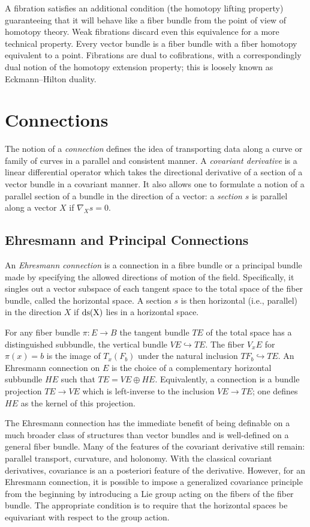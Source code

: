 \documentclass{article}
\theoremstyle{definition}
\begin{document}
    
    A fibration satisfies an additional condition (the homotopy lifting property) guaranteeing that it will behave like a fiber bundle from the point of view of homotopy theory. Weak fibrations discard even this equivalence for a more technical property. Every vector bundle is a fiber bundle with a fiber homotopy equivalent to a point.  Fibrations are dual to cofibrations, with a correspondingly dual notion of the homotopy extension property; this is loosely known as Eckmann–Hilton duality.
    

\section{Connections}
    The notion of a \textit{connection} defines the idea of transporting data along a curve or family of curves in a parallel and consistent manner. A \textit{covariant derivative} is a linear differential operator which takes the directional derivative of a section of a vector bundle in a covariant manner. It also allows one to formulate a notion of a parallel section of a bundle in the direction of a vector: a \textit{section} $s$ is parallel along a vector $X$ if $\nabla _{X}s=0$. 

\subsection{Ehresmann and Principal Connections}
    An \textit{Ehresmann connection} is a connection in a fibre bundle or a principal bundle made by specifying the allowed directions of motion of the field. Specifically, it singles out a vector subspace of each tangent space to the total space of the fiber bundle, called the horizontal space. A section $s$ is then horizontal (i.e., parallel) in the direction $X$ if $\rm {d}s(X)$ lies in a horizontal space.

    For any fiber bundle $\pi : E \rightarrow B$ the tangent bundle $T E$ of the total space has a distinguished subbundle, the vertical bundle $V E \hookrightarrow T E$. The fiber $V_xE$ for $\pi(x) = b$ is the image of $T_x(F_b)$ under the natural inclusion $T F_b \hookrightarrow T E$. An Ehresmann connection on $E$ is the choice of a complementary horizontal subbundle $HE$ such that $T E = V E \oplus HE$. Equivalently, a connection is a bundle projection $T E \rightarrow V E$ which is left-inverse to the inclusion $V E \rightarrow T E$; one defines $HE$ as the kernel of this projection. 
    
    The Ehresmann connection has the immediate benefit of being definable on a much broader class of structures than vector bundles and is well-defined on a general fiber bundle. Many of the features of the covariant derivative still remain: parallel transport, curvature, and holonomy. With the classical covariant derivatives, covariance is an a posteriori feature of the derivative. However, for an Ehresmann connection, it is possible to impose a generalized covariance principle from the beginning by introducing a Lie group acting on the fibers of the fiber bundle. The appropriate condition is to require that the horizontal spaces be equivariant with respect to the group action.
\end{document}
